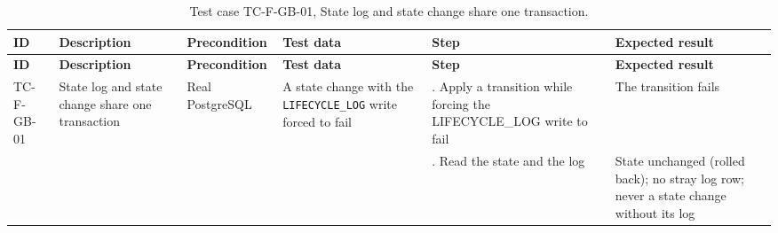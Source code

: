 {\footnotesize{}\renewcommand{\arraystretch}{1.1}
\begin{longtable}{|>{\raggedright\arraybackslash}p{}|>{\raggedright\arraybackslash}p{}|>{\raggedright\arraybackslash}p{}|>{\raggedright\arraybackslash}p{}|>{\raggedright\arraybackslash}p{}|>{\raggedright\arraybackslash}p{}|}
\caption{Test case TC-F-GB-01, State log and state change share one transaction.} \\
\hline
\textbf{ID} & \textbf{Description} & \textbf{Precondition} & \textbf{Test data} & \textbf{Step} & \textbf{Expected result} \\ \hline
\endfirsthead
\hline
\textbf{ID} & \textbf{Description} & \textbf{Precondition} & \textbf{Test data} & \textbf{Step} & \textbf{Expected result} \\ \hline
\endhead
TC-F-GB-01 & State log and state change share one transaction & Real PostgreSQL & A state change with the \texttt{LIFECYCLE\_\allowbreak{}LOG} write forced to fail & 1. Apply a transition while forcing the LIFECYCLE\_\allowbreak{}LOG write to fail & The transition fails \\ \cline{5-6}
 &  &  &  & 2. Read the state and the log & State unchanged (rolled back); no stray log row; never a state change without its log \\ \hline
\end{longtable}
}

